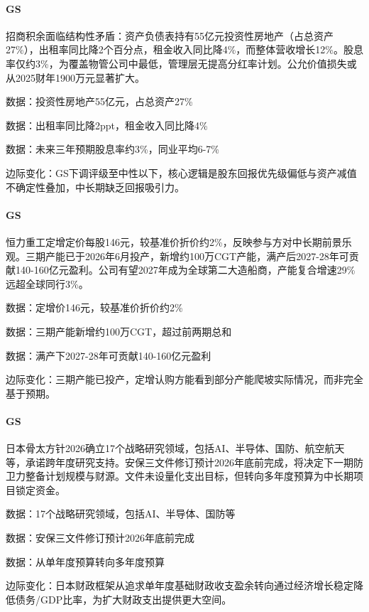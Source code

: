 \documentclass[11pt]{ctexart}
\begin{document}
\paragraph{GS} 招商积余面临结构性矛盾：资产负债表持有55亿元投资性房地产（占总资产27\%），出租率同比降2个百分点，租金收入同比降4\%，而整体营收增长12\%。股息率仅约3\%，为覆盖物管公司中最低，管理层无提高分红率计划。公允价值损失或从2025财年1900万元显著扩大。
{\small\color{refgray}数据：投资性房地产55亿元，占总资产27\%\par}
{\small\color{refgray}数据：出租率同比降2ppt，租金收入同比降4\%\par}
{\small\color{refgray}数据：未来三年预期股息率约3\%，同业平均6-7\%\par}
{\small\color{refgray}边际变化：GS下调评级至中性以下，核心逻辑是股东回报优先级偏低与资产减值不确定性叠加，中长期缺乏回报吸引力。\par}
\paragraph{GS} 恒力重工定增定价每股146元，较基准价折价约2\%，反映参与方对中长期前景乐观。三期产能已于2026年6月投产，新增约100万CGT产能，满产后2027-28年可贡献140-160亿元盈利。公司有望2027年成为全球第二大造船商，产能复合增速29\%远超全球同行3\%。
{\small\color{refgray}数据：定增价146元，较基准价折价约2\%\par}
{\small\color{refgray}数据：三期产能新增约100万CGT，超过前两期总和\par}
{\small\color{refgray}数据：满产下2027-28年可贡献140-160亿元盈利\par}
{\small\color{refgray}边际变化：三期产能已投产，定增认购方能看到部分产能爬坡实际情况，而非完全基于预期。\par}
\paragraph{GS} 日本骨太方针2026确立17个战略研究领域，包括AI、半导体、国防、航空航天等，承诺跨年度研究支持。安保三文件修订预计2026年底前完成，将决定下一期防卫力整备计划规模与财源。文件未设量化支出目标，但转向多年度预算为中长期项目锁定资金。
{\small\color{refgray}数据：17个战略研究领域，包括AI、半导体、国防等\par}
{\small\color{refgray}数据：安保三文件修订预计2026年底前完成\par}
{\small\color{refgray}数据：从单年度预算转向多年度预算\par}
{\small\color{refgray}边际变化：日本财政框架从追求单年度基础财政收支盈余转向通过经济增长稳定降低债务/GDP比率，为扩大财政支出提供更大空间。\par}
\end{document}
